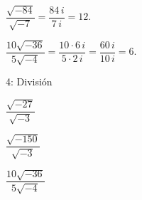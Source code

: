 
\begin{ejemplos}
  \item \(\dfrac{\sqrt{-84}}{\sqrt{-7}} = \dfrac{84\,i}{7\,i} = 12\).
  \item \(\dfrac{10\sqrt{-36}}{5\sqrt{-4}} = \dfrac{10\cdot 6\,i}{5\cdot 2\,i} = \dfrac{60\,i}{10\,i} = 6\).
\end{ejemplos}

\begin{actividad}{4: División}
  \item \(\dfrac{\sqrt{-27}}{\sqrt{-3}}\)
  \item \(\dfrac{\sqrt{-150}}{\sqrt{-3}}\)
  \item \(\dfrac{10\sqrt{-36}}{5\sqrt{-4}}\)
\end{actividad}